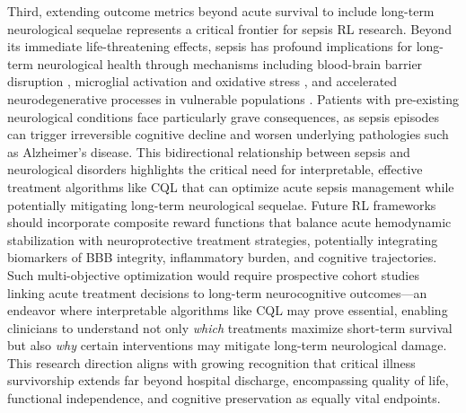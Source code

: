 Third, extending outcome metrics beyond acute survival to include long-term neurological sequelae represents a critical frontier for sepsis RL research. Beyond its immediate life-threatening effects, sepsis has profound implications for long-term neurological health through mechanisms including blood-brain barrier disruption \citep{nwafor2019bbb_targeting}, microglial activation and oxidative stress \citep{barichello2013oxidative_sepsis}, and accelerated neurodegenerative processes in vulnerable populations \citep{guerra2012dementia_risk_icu}. Patients with pre-existing neurological conditions face particularly grave consequences, as sepsis episodes can trigger irreversible cognitive decline and worsen underlying pathologies such as Alzheimer's disease. This bidirectional relationship between sepsis and neurological disorders highlights the critical need for interpretable, effective treatment algorithms like CQL that can optimize acute sepsis management while potentially mitigating long-term neurological sequelae. Future RL frameworks should incorporate composite reward functions that balance acute hemodynamic stabilization with neuroprotective treatment strategies, potentially integrating biomarkers of BBB integrity, inflammatory burden, and cognitive trajectories. Such multi-objective optimization would require prospective cohort studies linking acute treatment decisions to long-term neurocognitive outcomes—an endeavor where interpretable algorithms like CQL may prove essential, enabling clinicians to understand not only \textit{which} treatments maximize short-term survival but also \textit{why} certain interventions may mitigate long-term neurological damage. This research direction aligns with growing recognition that critical illness survivorship extends far beyond hospital discharge, encompassing quality of life, functional independence, and cognitive preservation as equally vital endpoints.

